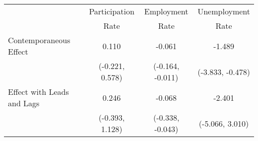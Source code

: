 \begin{tabular}{l|c|c|c}
\hline
\hline
& Participation & Employment & Unemployment \\
& Rate          & Rate       & Rate \\
\hline
Contemporaneous Effect
& 0.110 & -0.061 & -1.489 \\
& {\scriptsize (-0.221, 0.578)}& {\scriptsize (-0.164, -0.011)}& {\scriptsize (-3.833, -0.478)}\\ [0.1cm]
\hline
Effect with Leads and Lags
& 0.246 & -0.068 & -2.401 \\
& {\scriptsize (-0.393, 1.128)}& {\scriptsize (-0.338, -0.043)}& {\scriptsize (-5.066, 3.010)}\\ [0.1cm]
\hline
\hline
\end{tabular}
